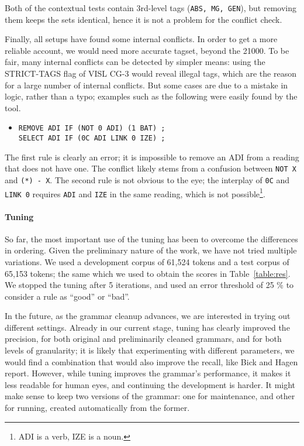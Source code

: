 {{\noindent Both of the contextual tests contain 3rd-level tags
(\texttt{ABS, MG, GEN}), but removing them keeps the sets identical,
hence it is not a problem for the conflict check.



Finally, all setups have found some internal conflicts. In order to
get a more reliable account, we would need more accurate tagset,
beyond the 21000. To be fair, many internal conflicts can be detected
by simpler means: using the STRICT-TAGS flag of VISL CG-3 would reveal
illegal tags, which are the reason for a large number of internal
conflicts.  But some cases are due to a mistake in logic, rather than
a typo; examples such as the following were easily found by the
tool. %
\begin{itemize}
\item[]
\begin{verbatim}
REMOVE ADI IF (NOT 0 ADI) (1 BAT) ;
SELECT ADI IF (0C ADI LINK 0 IZE) ;
\end{verbatim}
\end{itemize}

\noindent The first rule is clearly an error; it is impossible to remove an ADI from a reading that does not have one.
The conflict likely stems from a confusion between \texttt{NOT X} and \texttt{(*) - X}.
The second rule is not obvious to the eye; the interplay of \texttt{0C} and \texttt{LINK 0} requires 
\texttt{ADI} and \texttt{IZE} in the same reading, which is not possible\footnote{ADI is a verb, IZE is a noun.}.


\paragraph{Tuning}

So far, the most important use of the tuning has been to overcome
the differences in ordering. 
Given the preliminary nature of the work, we have not tried multiple
variations. We used a development corpus of 61,524
tokens and a test corpus of 65,153 tokens; the same which we used to
obtain the scores in Table~\ref{table:res}. We stopped the tuning
after 5 iterations, and used an error threshold of 25 \% to consider a
rule as ``good'' or ``bad''. 

In the future, as the grammar cleanup advances, we are interested in
trying out different settings.
Already in our current stage, tuning has clearly improved the
precision, for both original and preliminarily cleaned grammars, and
for both levels of granularity; it is likely that experimenting with
different parameters, we would find a combination that would also
improve the recall, like Bick and Hagen
\cite{bick2013tuning,bick_hagen2015obt} report.  However, while tuning
improves the grammar's performance, it makes it less readable for
human eyes, and continuing the development is harder. It might make
sense to keep two versions of the grammar: one for maintenance, and
other for running, created automatically from the former.

}}
